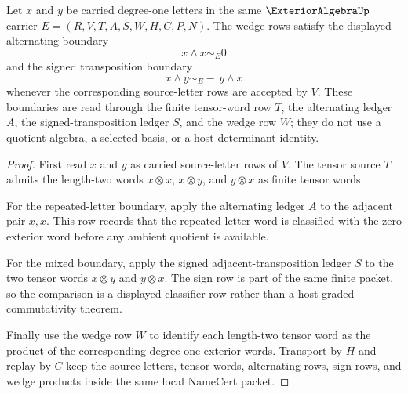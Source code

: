 \begin{theorem}
\label{thm:exterior-algebra-wedge-alternation}
Let $x$ and $y$ be carried degree-one letters in the same $\ExteriorAlgebraUp$ carrier $E=(R,V,T,A,S,W,H,C,P,N)$. The wedge rows satisfy the displayed alternating boundary
$$
x \wedge x \sim_E 0
$$
and the signed transposition boundary
$$
x \wedge y \sim_E -\, y \wedge x
$$
whenever the corresponding source-letter rows are accepted by $V$. These boundaries are read through the finite tensor-word row $T$, the alternating ledger $A$, the signed-transposition ledger $S$, and the wedge row $W$; they do not use a quotient algebra, a selected basis, or a host determinant identity.
\end{theorem}
\begin{proof}
First read $x$ and $y$ as carried source-letter rows of $V$. The tensor source $T$ admits the length-two words $x\otimes x$, $x\otimes y$, and $y\otimes x$ as finite tensor words.

For the repeated-letter boundary, apply the alternating ledger $A$ to the adjacent pair $x,x$. This row records that the repeated-letter word is classified with the zero exterior word before any ambient quotient is available.

For the mixed boundary, apply the signed adjacent-transposition ledger $S$ to the two tensor words $x\otimes y$ and $y\otimes x$. The sign row is part of the same finite packet, so the comparison is a displayed classifier row rather than a host graded-commutativity theorem.

Finally use the wedge row $W$ to identify each length-two tensor word as the product of the corresponding degree-one exterior words. Transport by $H$ and replay by $C$ keep the source letters, tensor words, alternating rows, sign rows, and wedge products inside the same local NameCert packet.
\end{proof}

